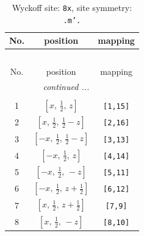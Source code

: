 \documentclass[fleqn,8pt]{jsarticle}
\begin{document}
\begin{longtable}{ccc}
\caption{Wyckoff site: {\tt 8x}, site symmetry: {\tt .m'.}}
 \\
 \hline \hline
No. & position & mapping \\ \hline \endfirsthead

\multicolumn{2}{l}{\tablename\ \thetable{}} \\
 \hline \hline
No. & position & mapping \\ \hline \endhead

 \hline \hline
\multicolumn{2}{r}{\footnotesize\it continued ...} \\ \endfoot

 \hline \hline
\multicolumn{2}{r}{} \\ \endlastfoot

1 & $\left[ x,\, \frac{1}{2},\, z \right]$ & {\tt [1,15]} \\ \hline
2 & $\left[ x,\, \frac{1}{2},\, \frac{1}{2} - z \right]$ & {\tt [2,16]} \\ \hline
3 & $\left[ - x,\, \frac{1}{2},\, \frac{1}{2} - z \right]$ & {\tt [3,13]} \\ \hline
4 & $\left[ - x,\, \frac{1}{2},\, z \right]$ & {\tt [4,14]} \\ \hline
5 & $\left[ - x,\, \frac{1}{2},\, - z \right]$ & {\tt [5,11]} \\ \hline
6 & $\left[ - x,\, \frac{1}{2},\, z + \frac{1}{2} \right]$ & {\tt [6,12]} \\ \hline
7 & $\left[ x,\, \frac{1}{2},\, z + \frac{1}{2} \right]$ & {\tt [7,9]} \\ \hline
8 & $\left[ x,\, \frac{1}{2},\, - z \right]$ & {\tt [8,10]} \\
\end{longtable}
\renewcommand{\arraystretch}{1.2}
\end{document}
